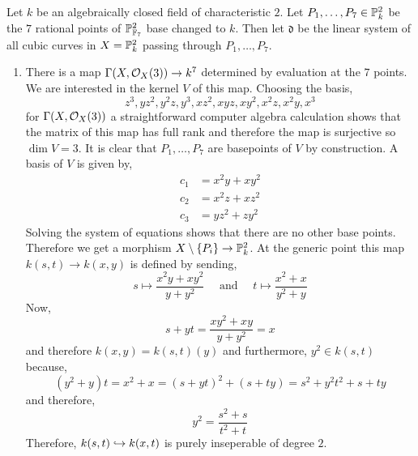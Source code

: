 \documentclass[12pt]{article}
\begin{document}
Let $k$ be an algebraically closed field of characteristic $2$. Let $P_1, \dots, P_7 \in \P^2_k$ be the $7$ rational points of $\P^2_{\FF_7}$ base changed to $k$. Then let $\mathfrak{d}$ be the linear system of all cubic curves in $X = \P^2_k$ passing through $P_1, \dots, P_7$.

\begin{enumerate}
\item There is a map $\Gamma(X, \struct{X}(3)) \to k^7$ determined by evaluation at the $7$ points. We are interested in the kernel $V$ of this map. Choosing the basis,
\[ z^3, y z^2, y^2 z, y^3, x z^2, x y z, x y^2, x^2 z, x^2 y, x^3 \]
for $\Gamma(X, \struct{X}(3))$ a straightforward computer algebra calculation shows that the matrix of this map has full rank
and therefore the map is surjective so $\dim{V} = 3$. It is clear that $P_1, \dots, P_7$ are basepoints of $V$ by construction. 
A basis of $V$ is given by,
\begin{align*}
c_1 & = x^2 y + x y^2
\\
c_2 & = x^2 z + x z^2
\\
c_3 & = y z^2 + z y^2
\end{align*} 
Solving the system of equations shows that there are no other base points.
\bigskip\\
Therefore we get a morphism $X \setminus \{ P_i \} \to \P^2_k$. At the generic point this map $k(s,t) \to k(x,y)$ is defined by sending,
\[ s \mapsto \frac{x^2 y + x y^2}{y + y^2} \quad \text{ and } \quad t \mapsto \frac{x^2 + x}{y^2 + y} \]
Now,
\[ s + y t = \frac{x y^2 + xy}{y + y^2} = x \]
and therefore $k(x,y) = k(s,t)(y)$ and furthermore, $y^2 \in k(s,t)$ because,
\[ (y^2 + y) t = x^2 + x = (s + y t)^2 + (s + t y) = s^2 + y^2 t^2 + s + t y \]
and therefore,
\[ y^2 = \frac{s^2 + s}{t^2 + t} \]
Therefore, $k(s,t) \embed k(x,t)$ is purely inseperable of degree $2$. 


\end{enumerate}
\end{document}
